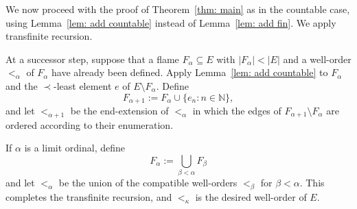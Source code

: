 \documentclass[12pt,a4paper]{amsart}
\theoremstyle{plain}
\theoremstyle{definition}
\begin{document}
We now proceed with the proof of Theorem~\ref{thm: main} as in the countable case, using
Lemma~\ref{lem: add countable} instead of Lemma~\ref{lem: add fin}. We apply transfinite
recursion.

At a successor step, suppose that a flame $F_\alpha\subseteq E$ with
$|F_\alpha|<|E|$ and a well-order $<_\alpha$ of $F_\alpha$ have already been defined.
Apply Lemma~\ref{lem: add countable} to $F_\alpha$ and the $\prec$-least element $e$
of $E\setminus F_\alpha$. Define
\[
F_{\alpha+1}:=F_\alpha\cup\{e_n : n\in\mathbb{N}\},
\]
and let $<_{\alpha+1}$ be the end-extension of $<_\alpha$ in which the edges of
$F_{\alpha+1}\setminus F_\alpha$ are ordered according to their enumeration.

If $\alpha$ is a limit ordinal, define
\[
F_\alpha:=\bigcup_{\beta<\alpha} F_\beta
\]
and let $<_\alpha$ be the union of the compatible well-orders $<_\beta$ for
$\beta<\alpha$. This completes the transfinite recursion, and $<_\kappa$ is the desired
well-order of $E$.

\printbibliography
\end{document}
